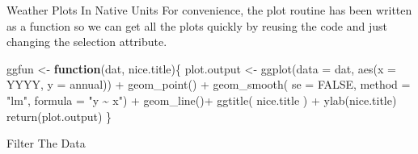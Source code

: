 \documentclass[
  ignorenonframetext,
]{beamer}
\newenvironment{Shaded}{\begin{snugshade}}{\end{snugshade}}
\newcommand{\AttributeTok}[1]{\textcolor[rgb]{0.77,0.63,0.00}{#1}}
\newcommand{\CommentTok}[1]{\textcolor[rgb]{0.56,0.35,0.01}{\textit{#1}}}
\newcommand{\ConstantTok}[1]{\textcolor[rgb]{0.00,0.00,0.00}{#1}}
\newcommand{\ControlFlowTok}[1]{\textcolor[rgb]{0.13,0.29,0.53}{\textbf{#1}}}
\newcommand{\FunctionTok}[1]{\textcolor[rgb]{0.00,0.00,0.00}{#1}}
\newcommand{\NormalTok}[1]{#1}
\newcommand{\OtherTok}[1]{\textcolor[rgb]{0.56,0.35,0.01}{#1}}
\newcommand{\SpecialCharTok}[1]{\textcolor[rgb]{0.00,0.00,0.00}{#1}}
\newcommand{\StringTok}[1]{\textcolor[rgb]{0.31,0.60,0.02}{#1}}
\begin{document}
\begin{frame}[fragile]{Weather Plots In Native Units}
\protect\hypertarget{weather-plots-in-native-units}{}
For convenience, the plot routine has been written as a function so we
can get all the plots quickly by reusing the code and just changing the
selection attribute.

\begin{Shaded}
\begin{Highlighting}[]
\NormalTok{ggfun }\OtherTok{\textless{}{-}} \ControlFlowTok{function}\NormalTok{(dat, nice.title)\{}
\NormalTok{  plot.output }\OtherTok{\textless{}{-}} \FunctionTok{ggplot}\NormalTok{(}\AttributeTok{data =}\NormalTok{ dat,}
                \FunctionTok{aes}\NormalTok{(}\AttributeTok{x =}\NormalTok{ YYYY,}
                    \AttributeTok{y =}\NormalTok{ annual)) }\SpecialCharTok{+}
    \FunctionTok{geom\_point}\NormalTok{() }\SpecialCharTok{+}
    \FunctionTok{geom\_smooth}\NormalTok{( }\AttributeTok{se =} \ConstantTok{FALSE}\NormalTok{, }
             \AttributeTok{method =} \StringTok{"lm"}\NormalTok{, }\AttributeTok{formula =} \StringTok{"y \textasciitilde{} x"}\NormalTok{) }\SpecialCharTok{+}
  \FunctionTok{geom\_line}\NormalTok{()}\SpecialCharTok{+} \FunctionTok{ggtitle}\NormalTok{( nice.title ) }\SpecialCharTok{+} \FunctionTok{ylab}\NormalTok{(nice.title)}
  \FunctionTok{return}\NormalTok{(plot.output)}
\NormalTok{\}}
\end{Highlighting}
\end{Shaded}
\end{frame}

\begin{frame}[fragile]{Filter The Data}
\protect\hypertarget{filter-the-data}{}
\begin{Shaded}
\end{Shaded}
\end{frame}
\end{document}
